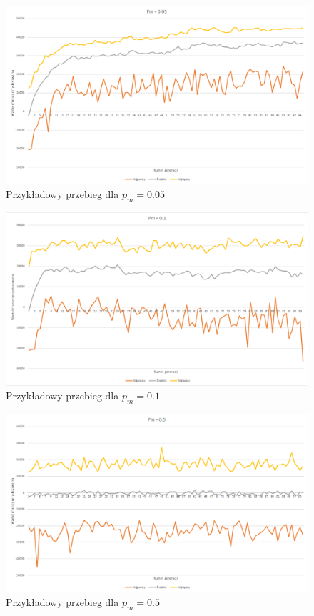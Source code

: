 \documentclass{article}
\begin{document}
	\begin{figure}[H]
		\centering
		\includegraphics[width=1\linewidth]{pm005.png}
		\caption{Przykładowy przebieg dla $p_m=0.05$}
		\label{fig:pm005}
	\end{figure}
	

	\begin{figure}[H]
	\centering
	\includegraphics[width=1\linewidth]{pm01.png}
	\caption{Przykładowy przebieg dla $p_m=0.1$}
	\label{fig:pm01}
	\end{figure}

	\begin{figure}[H]
		\centering
		\includegraphics[width=1\linewidth]{pm05.png}
		\caption{Przykładowy przebieg dla $p_m=0.5$}
		\label{fig:pm05}
	\end{figure}
\end{document}
